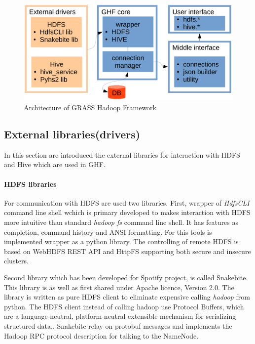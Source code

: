 \documentclass[a4paper,12pt,oneside]{report}
\begin{document}
  \begin{figure}[!htbp]
   \centering
   \includegraphics[width=1\textwidth]{./img/implementation.pdf}
   \caption[Architecture of GHF]{\centering Architecture of GRASS Hadoop Framework}
\end{figure} 
 
 
\subsection{External libraries(drivers)}
In this section are introduced the external libraries for interaction with HDFS and Hive which are used in GHF. 

\paragraph{HDFS libraries}
For communication with HDFS are used two libraries. First, wrapper of \textit{HdfsCLI} command line shell wchich is primary developed to makes interaction with HDFS more intuitive than standard \textit{hadoop fs} command line shell. It  has features as completion, command history and ANSI formatting. For this tools is implemented wrapper as a python library. The controlling of remote HDFS is based on WebHDFS REST API and HttpFS supporting both secure and insecure clusters.

Second library which has been developed for Spotify project, is called Snakebite. This library is as well as first shared under Apache licence, Version 2.0. The library is written as pure HDFS client to eliminate expensive calling \textit{hadoop} from python. The HDFS client instead of calling hadoop use Protocol Buffers, which  are a language-neutral, platform-neutral extensible mechanism for serializing structured data.\cite{protobuf}. Snakebite relay on protobuf messages and implements the Hadoop RPC protocol description for talking to the NameNode.\cite{snakebite}
\end{document}
